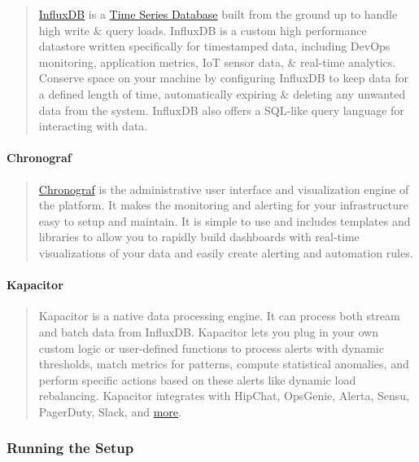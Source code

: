 \begin{quote}
\href{https://www.influxdata.com/time-series-platform/influxdb/}{InfluxDB}
is a \href{https://www.influxdata.com/time-series-database/}{Time Series
Database} built from the ground up to handle high write \& query loads.
InfluxDB is a custom high performance datastore written specifically for
timestamped data, including DevOps monitoring, application metrics, IoT
sensor data, \& real-time analytics. Conserve space on your machine by
configuring InfluxDB to keep data for a defined length of time,
automatically expiring \& deleting any unwanted data from the system.
InfluxDB also offers a SQL-like query language for interacting with
data.
\end{quote}

\paragraph{Chronograf}\label{chronograf}

\begin{quote}
\href{https://www.influxdata.com/time-series-platform/chronograf/}{Chronograf}
is the administrative user interface and visualization engine of the
platform. It makes the monitoring and alerting for your infrastructure
easy to setup and maintain. It is simple to use and includes templates
and libraries to allow you to rapidly build dashboards with real-time
visualizations of your data and easily create alerting and automation
rules.
\end{quote}

\paragraph{Kapacitor}\label{kapacitor}

\begin{quote}
Kapacitor is a native data processing engine. It can process both stream
and batch data from InfluxDB. Kapacitor lets you plug in your own custom
logic or user-defined functions to process alerts with dynamic
thresholds, match metrics for patterns, compute statistical anomalies,
and perform specific actions based on these alerts like dynamic load
rebalancing. Kapacitor integrates with HipChat, OpsGenie, Alerta, Sensu,
PagerDuty, Slack, and
\href{https://www.influxdata.com/products/integrations/}{more}.
\end{quote}

\subsubsection{Running the Setup}\label{running-the-setup}

